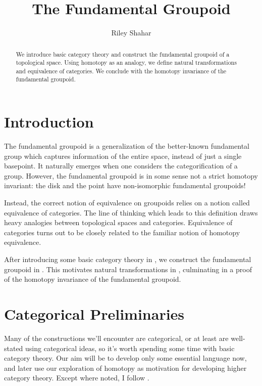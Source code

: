 \documentclass[11 pt]{amsart}
\title{The Fundamental Groupoid}
\author{Riley Shahar}
\theoremstyle{plain}   %
\theoremstyle{definition}
\theoremstyle{remark}
\numberwithin{equation}{section}
\begin{document}
\begin{abstract}
	We introduce basic category theory and construct the fundamental groupoid of a
	topological space. Using homotopy as an analogy, we define natural
	transformations and equivalence of categories. We conclude with the
	homotopy invariance of the fundamental groupoid.
\end{abstract}


\maketitle

\section{Introduction}

The fundamental groupoid is a generalization of the better-known fundamental
group which captures information of the entire space, instead of just a single
basepoint. It naturally emerges when one considers the categorification of a
group. However, the fundamental groupoid is in some sense not a strict homotopy
invariant: the disk and the point have non-isomorphic fundamental groupoids!

Instead, the correct notion of equivalence on groupoids relies on a notion
called equivalence of categories. The line of thinking which leads to this
definition draws heavy analogies between topological spaces and categories.
Equivalence of categories turns out to be closely related to the familiar notion
of homotopy equivalence.

After introducing some basic category theory in , we construct
the fundamental groupoid in . This motivates
natural transformations in , culminating in a
proof of the homotopy invariance of the fundamental groupoid.

\section{Categorical Preliminaries}\label{categories}

Many of the constructions we'll encounter are categorical, or at least are
well-stated using categorical ideas, so it's worth spending some time with basic
category theory. Our aim will be to develop only some essential language now,
and later use our exploration of homotopy as motivation for developing higher
category theory. Except where noted, I follow \cite[Sections 1.1-1.3]{Riehl}.
\end{document}
